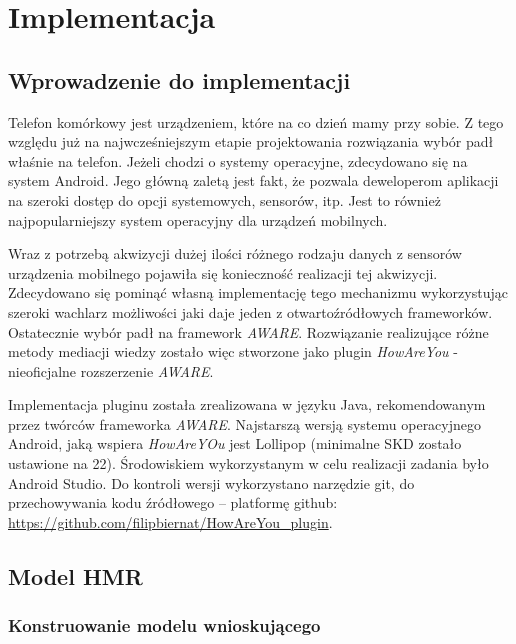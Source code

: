 \chapter{Implementacja}
\label{cha:implementacja}


\section{Wprowadzenie do implementacji}
\label{sec:wprowadzenieDoImplementacji}

Telefon komórkowy jest urządzeniem, które na co dzień mamy przy sobie. Z tego względu już na najwcześniejszym etapie projektowania rozwiązania wybór padł właśnie na telefon. Jeżeli chodzi o systemy operacyjne, zdecydowano się na system Android. Jego główną zaletą jest fakt, że pozwala deweloperom aplikacji na szeroki dostęp do opcji systemowych, sensorów, itp. Jest to również najpopularniejszy system operacyjny dla urządzeń mobilnych.

Wraz z potrzebą akwizycji dużej ilości różnego rodzaju danych z sensorów urządzenia mobilnego pojawiła się konieczność realizacji tej akwizycji. Zdecydowano się pominąć własną implementację tego mechanizmu wykorzystując szeroki wachlarz możliwości jaki daje jeden z otwartoźródłowych frameworków. Ostatecznie wybór padł na framework \textit{AWARE}. Rozwiązanie realizujące różne metody mediacji wiedzy zostało więc stworzone jako plugin \textit{HowAreYou} - nieoficjalne rozszerzenie \textit{AWARE}.

Implementacja pluginu została zrealizowana w języku Java, rekomendowanym przez twórców frameworka \textit{AWARE}\cite{AwareFramework}. Najstarszą wersją systemu operacyjnego Android, jaką wspiera \textit{HowAreYOu} jest Lollipop (minimalne SKD zostało ustawione na 22). Środowiskiem wykorzystanym w celu realizacji zadania było Android Studio. Do kontroli wersji wykorzystano narzędzie git, do przechowywania kodu źródłowego -- platformę github: \url{https://github.com/filipbiernat/HowAreYou_plugin}.


\section{Model HMR}
\label{sec:modelHmr2}

\subsection{Konstruowanie modelu wnioskującego}

